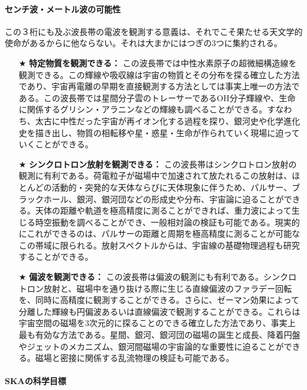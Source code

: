 \paragraph{センチ波・メートル波の可能性}

この３桁にも及ぶ波長帯の電波を観測する意義は、それでこそ果たせる天文学的使命があるからに他ならない。それは大まかにはつぎの3つに集約される。
\begin{itemize}
\item[★] {\bf 特定物質を観測できる：} この波長帯では中性水素原子の超微細構造線を観測できる。この輝線や吸収線は宇宙の物質とその分布を探る確立した方法であり、宇宙再電離の早期を直接観測する方法としては事実上唯一の方法である。この波長帯では星間分子雲のトレーサーであるOH分子輝線や、生命に関係するグリシン・アラニンなどの輝線も調べることができる。すなわち、太古に中性だった宇宙が再イオン化する過程を探り、銀河史や化学進化史を描き出し、物質の相転移や星・惑星・生命が作られていく現場に迫っていくことができる。
\item[★] {\bf シンクロトロン放射を観測できる：} この波長帯はシンクロトロン放射の観測に有利である。荷電粒子が磁場中で加速されて放たれるこの放射は、ほとんどの活動的・突発的な天体ならびに天体現象に伴うため、パルサー、ブラックホール、銀河、銀河団などの形成史や分布、宇宙論に迫ることができる。天体の距離や軌道を極高精度に測ることができれば、重力波によって生じる時空振動を調べることができ、一般相対論の検証も可能である。現実的にこれができるのは、パルサーの距離と周期を極高精度に測ることが可能なこの帯域に限られる。放射スペクトルからは、宇宙線の基礎物理過程も研究することができる。
\item[★] {\bf 偏波を観測できる：} この波長帯は偏波の観測にも有利である。シンクロトロン放射と、磁場中を通り抜ける際に生じる直線偏波のファラデー回転を、同時に高精度に観測することができる。さらに、ゼーマン効果によって分離した輝線も円偏波あるいは直線偏波で観測することができる。これらは宇宙空間の磁場を3次元的に探ることのできる確立した方法であり、事実上最も有効な方法である。星間、銀河、銀河団の磁場の誕生と成長、降着円盤やジェットのメカニズム、銀河間磁場の宇宙論的な重要性に迫ることができる。磁場と密接に関係する乱流物理の検証も可能である。
\end{itemize}

\paragraph{SKAの科学目標}

